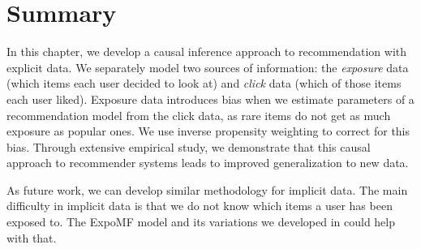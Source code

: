 \section{Summary}

In this chapter, we develop a causal inference approach to recommendation with explicit data. We separately model two sources of information: the \textit{exposure} data (which items each user decided to look at) and \textit{click} data (which of
those items each user liked). Exposure data introduces bias when we estimate parameters of a recommendation model from the click data, as rare items do not get as much exposure as popular ones. We use inverse propensity weighting to correct for this bias. Through extensive empirical study, we demonstrate that this causal approach to recommender systems leads to improved generalization to new data.

As future work, we can develop similar methodology for implicit data. The main difficulty in implicit data is that we do not know which items a user has been exposed to. The ExpoMF model and its variations we developed in  could help with that.  






